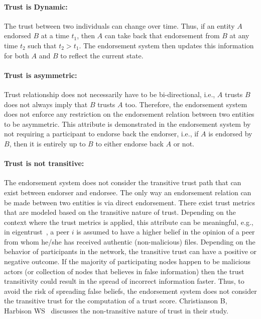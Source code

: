 \paragraph{Trust is Dynamic:}The trust between two individuals can change over
time. Thus, if an entity $A$ endorsed $B$ at a time $t_{1}$, then $A$ can take
back that endorsement from $B$  at any time $t_{2}$ such that $t_{2} > t_{1}$.
The endorsement system then updates this information for both $A$ and $B$ to
reflect the current state.  
\paragraph{Trust is asymmetric:}Trust relationship does not necessarily have
to be bi-directional, i.e., $A$ trusts $B$ does not always imply that $B$
trusts $A$ too. Therefore, the endorsement system does not enforce any
restriction on the endorsement relation between two entities to be asymmetric.
This attribute is demonstrated in the endorsement system by not requiring a
participant to endorse back the endorser, i.e., if $A$ is endorsed by $B$, then
it is entirely up to $B$ to either endorse back $A$ or not.
\paragraph{Trust is not transitive:}The endorsement system does not consider
the transitive trust path that can exist between endorser and endorsee. The
only way an endorsement relation can be made between two entities is via direct
endorsement. There exist trust metrics that are modeled based on the
transitive nature of trust. Depending on the context where the trust metrics is
applied, this attribute can be meaningful, e.g., in
eigentrust~\cite{kamvar2003eigentrust}, a peer $i$ is assumed to have a higher
belief in the opinion of a peer from whom he/she has received authentic
(non-malicious) files. Depending on the behavior of participants in the
network, the transitive trust can have a positive or negative outcome. If the
majority of participating nodes happen to be malicious actors (or collection of
nodes that believes in false information) then the trust transitivity could
result in the spread of incorrect information faster.  Thus, to avoid the risk
of spreading false beliefs, the endorsement system does not consider the
transitive trust for the computation of a trust score.  Christianson B,
Harbison WS~\cite{christianson1996isn} discusses the non-transitive nature
of trust in their study. 
%
